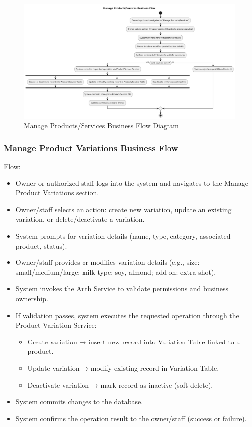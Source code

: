 \documentclass[]{VUMIFTemplateClass}
\begin{document}
\begin{figure}[H]
    \centering
    \includegraphics[width=1\textwidth]{images/diagrams/business/bpmn_products_services.png}
    \caption{Manage Products/Services Business Flow Diagram}
    \label{fig:product_service_manage_flow}
\end{figure}

\subsubsection{Manage Product Variations Business Flow}

Flow:
\begin{itemize}
\setlength{\itemsep}{2pt}
\setlength{\parskip}{0pt}
\setlength{\parsep}{0pt}
\item Owner or authorized staff logs into the system and navigates to the Manage Product Variations section.
\item Owner/staff selects an action: create new variation, update an existing variation, or delete/deactivate a variation.
\item System prompts for variation details (name, type, category, associated product, status).
\item Owner/staff provides or modifies variation details (e.g., size: small/medium/large; milk type: soy, almond; add-on: extra shot).
\item System invokes the Auth Service to validate permissions and business ownership.
\item If validation passes, system executes the requested operation through the Product Variation Service:
\begin{itemize}
\item Create variation → insert new record into Variation Table linked to a product.
\item Update variation → modify existing record in Variation Table.
\item Deactivate variation → mark record as inactive (soft delete).
\end{itemize}
\item System commits changes to the database.
\item System confirms the operation result to the owner/staff (success or failure).
\end{itemize}
\end{document}
